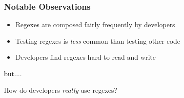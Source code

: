 

\begin{frame}
\frametitle{Notable Observations}

\begin{block}{}
\begin{itemize}
	\item Regexes are composed fairly frequently by developers
	\item Testing regexes is \emph{less} common than testing other code
	\item Developers find regexes hard to read and write
\end{itemize}
\end{block}

but....

\begin{block}{}
How do developers \emph{really} use regexes? 
\end{block}



\end{frame}









